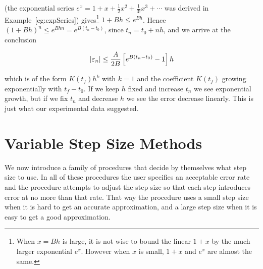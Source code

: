 (the exponential series $e^x= 1+x+\frac{1}{2}x^2+\frac{1}{3!}x^3+\cdots$
was derived in Example~\ref{eg:expSeries})
gives\footnote{When $x=Bh$ is large, it is not wise to bound the linear $1+x$ by the much larger exponential $e^x$. However when $x$ is small, $1+x$ and $e^x$ are almost the same.} $1+Bh\le e^{Bh}$. Hence $(1+Bh)^n\le e^{Bhn}=e^{B(t_n-t_0)}$, 
since $t_n=t_0+nh$, and we arrive at the conclusion
\begin{impeqn}\label{glbl trunc error Euler}
\begin{equation*}
|\varepsilon_n|\le \frac{A}{2B}\left[e^{B(t_n-t_0)}-1\right]h
\end{equation*}
\end{impeqn}
\noindent
which is of the form $K(t_f)h^k$ with $k=1$ and the coefficient $K(t_f)$ 
growing exponentially with $t_f-t_0$. If we keep $h$ fixed and increase $t_n$ we see exponential growth, but if we fix $t_n$ and decrease $h$ we see the error decrease linearly. 
This is just what our experimental data suggested.

\section{Variable Step Size Methods}

We now introduce a family of procedures that decide by themselves what step 
size to use. In all of these procedures the user specifies an acceptable error
rate and the procedure attempts to adjust the step size so that each step
introduces error at no more than that rate. That way the procedure uses a small step size when it is hard to get an accurate approximation, and a large step 
size when it is easy to get a good approximation.  

